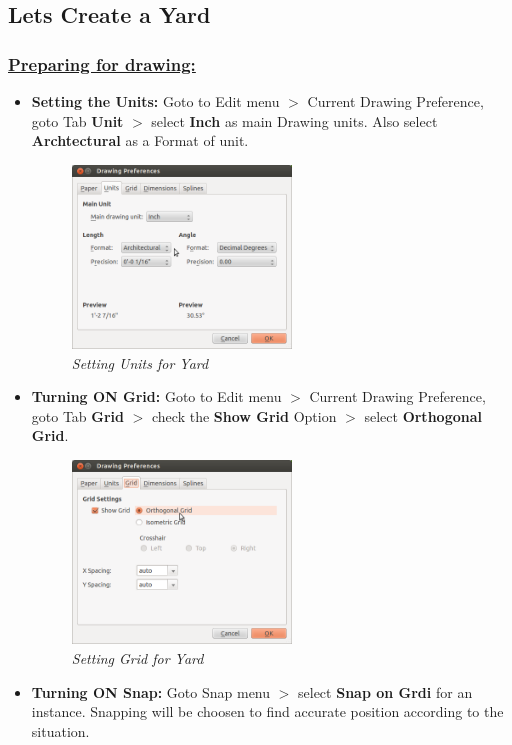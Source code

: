 \vspace{5 mm}  %
\subsection{Lets Create a Yard}
\vspace{2mm}
\subsubsection*{\underline{Preparing for drawing:}}
\begin{itemize}
\item{\textbf{Setting the Units:} Goto to Edit menu $>$ Current Drawing Preference, goto Tab \textbf{Unit} $>$ select \textbf{Inch} as main Drawing units. Also select \textbf{Archtectural} as a Format of unit.
       \begin{figure}[h!]
       \centering\includegraphics[width=220px]{./images-yard/units.png}
       \caption{\small \sl Setting Units for Yard}
       \end{figure}}
\item{\textbf{Turning ON Grid:} Goto to Edit menu $>$ Current Drawing Preference, goto Tab \textbf{Grid} $>$ check the \textbf{Show Grid} Option $>$ select \textbf{Orthogonal Grid}.
       \begin{figure}[h!]
       \centering\includegraphics[width=220px]{./images-yard/grid.png}
       \caption{\small \sl Setting Grid for Yard}
       \end{figure}}
\item{\textbf{Turning ON Snap:} Goto Snap menu $>$ select \textbf{Snap on Grdi} for an instance. Snapping will be choosen to find accurate position according to the situation.
}
\end{itemize}
